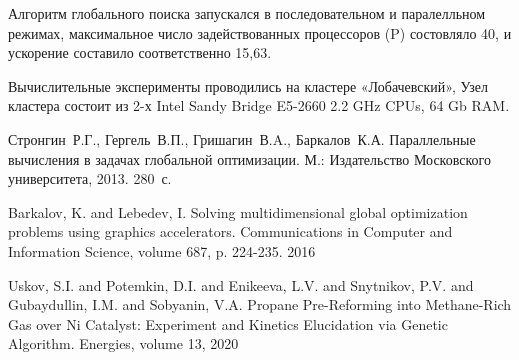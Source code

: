 \documentclass[11pt, oneside, a4paper]{article}
\begin{document}
Алгоритм глобального поиска запускался в последовательном и паралелльном режимах, максимальное число задействованных процессоров (P) состовляло 40, и ускорение составило соответственно 15,63.

Вычислительные эксперименты проводились на кластере «Лобачевский», Узел кластера состоит из 2-х Intel Sandy Bridge E5-2660 2.2 GHz CPUs, 64 Gb RAM.


\begin{biblio}


Стронгин~Р.Г., Гергель~В.П., Гришагин~В.A., Баркалов~К.А. Параллельные вычисления в задачах глобальной оптимизации. М.: Издательство Московского университета, 2013. 280~с.

 Barkalov, K. and Lebedev, I. Solving multidimensional global optimization problems using graphics accelerators. 
Communications in Computer and Information Science, volume 687, p. 224-235. 2016

 Uskov, S.I. and Potemkin, D.I. and Enikeeva, L.V. and Snytnikov, P.V. and Gubaydullin, I.M. and Sobyanin, V.A. Propane Pre-Reforming into Methane-Rich Gas over Ni Catalyst: Experiment and Kinetics Elucidation via Genetic Algorithm. Energies, volume  13, {2020}


\end{biblio}
\end{document}
